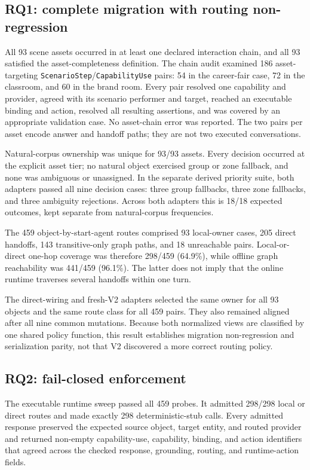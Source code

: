 \subsection{RQ1: complete migration with routing non-regression}

All 93 scene assets occurred in at least one declared interaction chain, and
all 93 satisfied the asset-completeness definition.  The chain audit examined
186 asset-targeting \texttt{ScenarioStep}/\texttt{CapabilityUse} pairs:
54 in the career-fair case, 72 in the classroom, and 60 in the brand room.
Every pair resolved one capability and provider, agreed with its scenario
performer and target, reached an executable binding and action, resolved all
resulting assertions, and was covered by an appropriate validation case.
No asset-chain error was reported.  The two pairs per asset encode answer and
handoff paths; they are not two executed conversations.

Natural-corpus ownership was unique for 93/93 assets.  Every decision occurred
at the explicit asset tier; no natural object exercised group or zone fallback,
and none was ambiguous or unassigned.  In the separate derived priority suite,
both adapters passed all nine decision cases: three group fallbacks, three zone
fallbacks, and three ambiguity rejections.  Across both adapters this is 18/18
expected outcomes, kept separate from natural-corpus frequencies.

The 459 object-by-start-agent routes comprised 93 local-owner cases, 205 direct
handoffs, 143 transitive-only graph paths, and 18 unreachable pairs.
Local-or-direct one-hop coverage was therefore 298/459 (64.9\%), while offline
graph reachability was 441/459 (96.1\%).  The latter does not imply that the
online runtime traverses several handoffs within one turn.

The direct-wiring and fresh-V2 adapters selected the same owner for all 93
objects and the same route class for all 459 pairs.  They also remained aligned
after all nine common mutations.  Because both normalized views are classified
by one shared policy function, this result establishes migration
non-regression and serialization parity, not that V2 discovered a more correct
routing policy.

\subsection{RQ2: fail-closed enforcement}

The executable runtime sweep passed all 459 probes.  It admitted 298/298 local
or direct routes and made exactly 298 deterministic-stub calls.  Every admitted
response preserved the expected source object, target entity, and routed
provider and returned non-empty capability-use, capability, binding, and action
identifiers that agreed across the checked response, grounding, routing, and
runtime-action fields.

